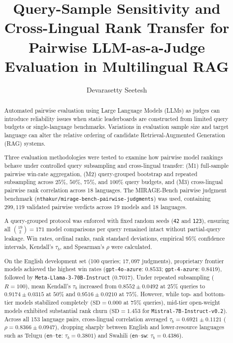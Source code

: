 \documentclass[sigconf]{acmart}
\begin{document}
\title{Query-Sample Sensitivity and Cross-Lingual Rank Transfer for Pairwise LLM-as-a-Judge Evaluation in Multilingual RAG}

\author{Devarasetty Seetesh}

\begin{abstract}
Automated pairwise evaluation using Large Language Models (LLMs) as judges can introduce reliability issues when static leaderboards are constructed from limited query budgets or single-language benchmarks. Variations in evaluation sample size and target language can alter the relative ordering of candidate Retrieval-Augmented Generation (RAG) systems.

Three evaluation methodologies were tested to examine how pairwise model rankings behave under controlled query subsampling and cross-lingual transfer: (M1) full-sample pairwise win-rate aggregation, (M2) query-grouped bootstrap and repeated subsampling across $25\%$, $50\%$, $75\%$, and $100\%$ query budgets, and (M3) cross-lingual pairwise rank correlation across 18 languages. The MIRAGE-Bench pairwise judgment benchmark (\texttt{nthakur/mirage-bench-pairwise-judgments}) was used, containing $299{,}119$ validated pairwise verdicts across 19 models and 18 languages.

A query-grouped protocol was enforced with fixed random seeds (\texttt{42} and \texttt{123}), ensuring all $\binom{19}{2} = 171$ model comparisons per query remained intact without partial-query leakage. Win rates, ordinal ranks, rank standard deviations, empirical $95\%$ confidence intervals, Kendall's $\tau_b$, and Spearman's $\rho$ were calculated.

On the English development set (100 queries; $17{,}097$ judgments), proprietary frontier models achieved the highest win rates (\texttt{gpt-4o-azure}: $0.8533$; \texttt{gpt-4-azure}: $0.8419$), followed by \texttt{Meta-Llama-3-70B-Instruct} ($0.7017$). Under repeated subsampling ($R=100$), mean Kendall's $\tau_b$ increased from $0.8552 \pm 0.0492$ at $25\%$ queries to $0.9174 \pm 0.0315$ at $50\%$ and $0.9516 \pm 0.0210$ at $75\%$. However, while top- and bottom-tier models stabilized completely ($\text{SD} = 0.000$ at $75\%$ queries), mid-tier open-weight models exhibited substantial rank churn ($\text{SD} = 1.453$ for \texttt{Mistral-7B-Instruct-v0.2}). Across all 153 language pairs, cross-lingual correlation averaged $\tau_b = 0.6921 \pm 0.1121$ ($\rho = 0.8366 \pm 0.0947$), dropping sharply between English and lower-resource languages such as Telugu (\texttt{en}--\texttt{te}: $\tau_b = 0.3801$) and Swahili (\texttt{en}--\texttt{sw}: $\tau_b = 0.4386$).
\end{abstract}
\end{document}
